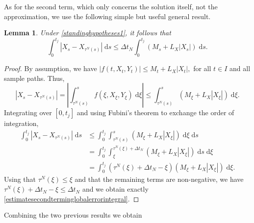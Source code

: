 \documentclass[reqno,12pt]{amsart}
\theoremstyle{plain}%
\newtheorem{lem}{Lemma}[section]
\theoremstyle{definition}
\begin{document}
As for the second term, which only concerns the solution itself, not the approximation, we use the following simple but useful general result.

\begin{lem}
    \label{estimatesecondterminglobalerror}
    Under \cref{standinghypotheses1}, it follows that
    \begin{equation}
        \label{estimatesecondterminglobalerrorintegral}
        \int_0^{t_j}\left|X_s - X_{\tau^N(s)}\right| \;\mathrm{d}s \leq \Delta t_N \int_0^{t_j} (M_s + L_X|X_s|) \;\mathrm{d}s.
    \end{equation}
\end{lem}

\begin{proof}
    By assumption, we have $|f(t, X_t, Y_t)| \leq M_t + L_X|X_t|,$ for all $t\in I$ and all sample paths. Thus,
    \[
      \left|X_s - X_{\tau^N(s)}\right| = \left|\int_{\tau^N(s)}^s f(\xi, X_\xi, Y_\xi)\;\mathrm{d}\xi\right| \leq \int_{\tau^N(s)}^s (M_\xi + L_X|X_\xi|)\;\mathrm{d}\xi.
    \]
    Integrating over $[0, t_j]$ and using Fubini's theorem to exchange the order of integration,
    \begin{align*}
        \int_0^{t_j}\left|X_s - X_{\tau^N(s)}\right| \;\mathrm{d}s & \leq \int_0^{t_j}\int_{\tau^N(s)}^s (M_\xi + L_X|X_\xi|) \;\mathrm{d}\xi \;\mathrm{d}s \\
        & = \int_0^{t_j}\int_\xi^{\tau^N(\xi) + \Delta t_N} (M_\xi + L_X|X_\xi|) \;\mathrm{d}s \;\mathrm{d}\xi \\
        & =  \int_0^{t_j} (\tau^N(\xi) + \Delta t_N - \xi) (M_\xi + L_X|X_\xi|) \;\mathrm{d}\xi.
    \end{align*}
    Using that $\tau^N(\xi) \leq \xi$ and that the remaining terms are non-negative, we have $\tau^N(\xi) + \Delta t_N - \xi \leq \Delta t_N$ and we obtain exactly \eqref{estimatesecondterminglobalerrorintegral}.
\end{proof}

Combining the two previous results we obtain
\end{document}
